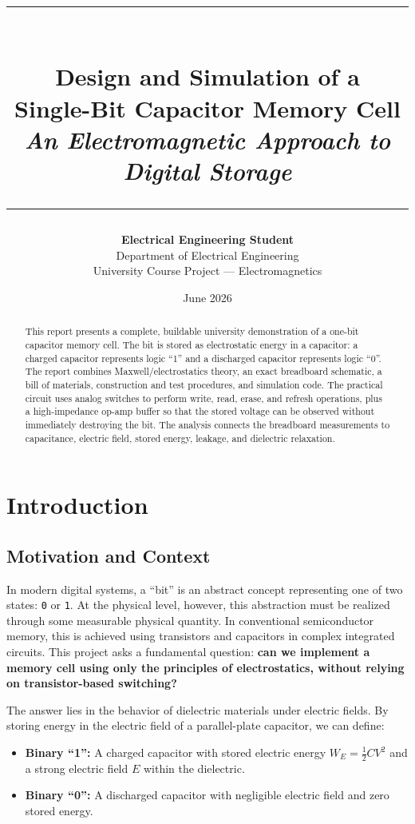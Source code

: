 \documentclass[12pt,a4paper]{report}
\title{
    \vspace{-2cm}
    \rule{\textwidth}{1.5pt}\\[0.4cm]
    {\Huge\bfseries Design and Simulation of a\\[0.3cm]
    Single-Bit Capacitor Memory Cell}\\[0.2cm]
    {\Large\itshape An Electromagnetic Approach to Digital Storage}\\[0.4cm]
    \rule{\textwidth}{1.5pt}
}
\author{
    \textbf{Electrical Engineering Student}\\
    Department of Electrical Engineering\\
    University Course Project --- Electromagnetics
}
\date{June 2026}
\begin{document}
\maketitle
\thispagestyle{empty}

\vfill
\begin{abstract}
\noindent
This report presents a complete, buildable university demonstration of a one-bit capacitor memory cell. The bit is stored as electrostatic energy in a capacitor: a charged capacitor represents logic ``1'' and a discharged capacitor represents logic ``0''. The report combines Maxwell/electrostatics theory, an exact breadboard schematic, a bill of materials, construction and test procedures, and simulation code. The practical circuit uses analog switches to perform write, read, erase, and refresh operations, plus a high-impedance op-amp buffer so that the stored voltage can be observed without immediately destroying the bit. The analysis connects the breadboard measurements to capacitance, electric field, stored energy, leakage, and dielectric relaxation.
\end{abstract}

\vfill
\tableofcontents
\newpage

\chapter{Introduction}

\section{Motivation and Context}

In modern digital systems, a ``bit'' is an abstract concept representing one of two states: \texttt{0} or \texttt{1}. At the physical level, however, this abstraction must be realized through some measurable physical quantity. In conventional semiconductor memory, this is achieved using transistors and capacitors in complex integrated circuits. This project asks a fundamental question: \textbf{can we implement a memory cell using only the principles of electrostatics, without relying on transistor-based switching?}

The answer lies in the behavior of dielectric materials under electric fields. By storing energy in the electric field of a parallel-plate capacitor, we can define:
\begin{itemize}[leftmargin=*]
    \item \textbf{Binary ``1'':} A charged capacitor with stored electric energy $W_E = \frac{1}{2}CV^2$ and a strong electric field $E$ within the dielectric.
    \item \textbf{Binary ``0'':} A discharged capacitor with negligible electric field and zero stored energy.
\end{itemize}
\end{document}
